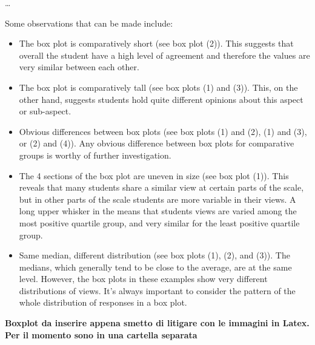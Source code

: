 \dots

Some observations that can be made include:
\begin{itemize}
    \item The box plot is comparatively short (see box plot  (2)). This suggests that overall the student have a high level of agreement and therefore the values are very similar between each other.
    \item The box plot is comparatively tall (see box plots (1) and (3)). This, on the other hand, suggests students hold quite different opinions about this aspect or sub-aspect.
    \item Obvious differences between box plots (see box plots (1) and (2), (1) and (3), or (2) and (4)). Any obvious difference between box plots for comparative groups is worthy of further investigation.
    \item The 4 sections of the box plot are uneven in size (see box plot (1)). This reveals that many students share a similar view at certain parts of the scale, but in other parts of the scale students are more variable in their views. A long upper whisker in the means that students views are varied among the most positive quartile group, and very similar for the least positive quartile group. 
    \item Same median, different distribution (see box plots (1), (2), and (3)). The medians, which generally tend to be close to the average, are at the same level. However, the box plots in these examples show very different distributions of views. It's always important to consider the pattern of the whole distribution of responses in a box plot.
\end{itemize}


\textbf{Boxplot da inserire appena smetto di litigare con le immagini in Latex. Per il momento sono in una cartella separata}

